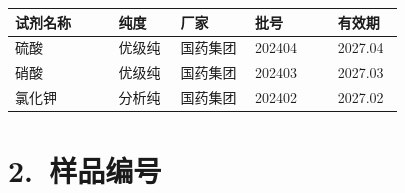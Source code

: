 \documentclass[UTF8,10pt,a4paper,fontset=fandol]{ctexart}
\newcommand{\fieldvalue}[1]{#1}
\newcommand{\handwritten}[1]{#1}
\begin{document}
\begin{tabular}{|p{0.25\linewidth}|p{0.15\linewidth}|p{0.18\linewidth}|p{0.20\linewidth}|p{0.16\linewidth}|}
\hline
试剂名称 & 纯度 & 厂家 & 批号 & 有效期 \\
\hline
硫酸 &
\fieldvalue{\handwritten{优级纯}} &
\fieldvalue{\handwritten{国药集团}} &
\fieldvalue{\handwritten{202404}} &
\fieldvalue{\handwritten{2027.04}} \\
\hline
硝酸 &
\fieldvalue{\handwritten{优级纯}} &
\fieldvalue{\handwritten{国药集团}} &
\fieldvalue{\handwritten{202403}} &
\fieldvalue{\handwritten{2027.03}} \\
\hline
氯化钾 &
\fieldvalue{\handwritten{分析纯}} &
\fieldvalue{\handwritten{国药集团}} &
\fieldvalue{\handwritten{202402}} &
\fieldvalue{\handwritten{2027.02}} \\
\hline
\end{tabular}

\section*{2.\ 样品编号}
\end{document}

